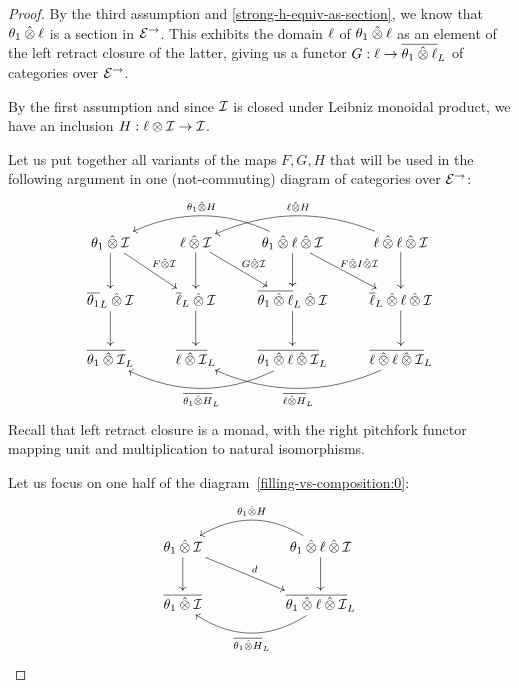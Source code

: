 \documentclass[reqno,10pt,a4paper,oneside]{amsart}
\begin{document}
\begin{proof}
By the third assumption and \cref{strong-h-equiv-as-section}, we know that $\thetar \hatotimes \intervall$ is a section in $\catE^{\to}$.
This exhibits the domain $\intervall$ of $\thetar \hatotimes \intervall$ as an element of the left retract closure of the latter, giving us a functor $G : \intervall \to \overline{\thetar \hatotimes \intervall}_L$ of categories over $\catE^{\to}$.

By the first assumption and since $\cal{I}$ is closed under Leibniz monoidal product, we have an inclusion $H : \intervall \otimes \cal{I} \to \cal{I}$.

Let us put together all variants of the maps $F, G, H$ that will be used in the following argument in one (not-commuting) diagram of categories over $\cal{E}^{\to}$:
\begin{equation}
\label{filling-vs-composition:0}
\begin{gathered}
\xymatrix{
  \thetar \hatotimes \cal{I}
  \ar[d]
  \ar[dr]^{F \hatotimes \cal{I}}
&
  \intervall \hatotimes \cal{I}
  \ar[d]
  \ar[dr]^{G \hatotimes \cal{I}}
&
  \thetar \hatotimes \intervall \hatotimes \cal{I}
  \ar[d]
  \ar[dr]^{F \hatotimes \interval \hatotimes \cal{I}}
  \ar@/_2em/[ll]_{\thetar \hatotimes H}
&
  \intervall \hatotimes \intervall \hatotimes \cal{I}
  \ar[d]
  \ar@/_2em/[ll]_{\intervall \hatotimes H}
\\
  \overline{\thetar}_L \hatotimes \cal{I}
  \ar[d]
&
  \overline{\intervall}_L \hatotimes \cal{I}
  \ar[d]
&
  \overline{\thetar \hatotimes \intervall}_L \hatotimes \cal{I}
  \ar[d]
&
  \overline{\intervall}_L \hatotimes \intervall \hatotimes \cal{I}
  \ar[d]
\\
  \overline{\thetar \hatotimes \cal{I}}_L
&
  \overline{\intervall \hatotimes \cal{I}}_L
&
  \overline{\thetar \hatotimes \intervall \hatotimes \cal{I}}_L
  \ar@/^2em/[ll]^{\overline{\thetar \hatotimes H}_L}
&
  \overline{\intervall \hatotimes \intervall \hatotimes \cal{I}}_L
  \ar@/^2em/[ll]^{\overline{\intervall \hatotimes H}_L}
}
\end{gathered}
\end{equation}
Recall that left retract closure is a monad, with the right pitchfork functor mapping unit and multiplication to natural isomorphisms.

Let us focus on one half of the diagram~\eqref{filling-vs-composition:0}:
\[
\xymatrix{
  \thetar \hatotimes \cal{I}
  \ar[d]
  \ar[drr]^{d}
&&
  \thetar \hatotimes \intervall \hatotimes \cal{I}
  \ar[d]
  \ar@/_2em/[ll]_{\thetar \hatotimes H}
\\
  \overline{\thetar \hatotimes \cal{I}}
&&
  \overline{\thetar \hatotimes \intervall \hatotimes \cal{I}}_L
  \ar@/^2em/[ll]^{\overline{\thetar \hatotimes H}_L}
}
\]


\end{proof}
\end{document}
